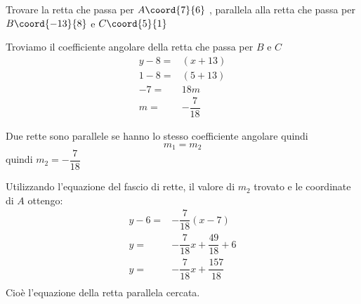 	Trovare la retta che passa per $A\coord{7}{6}$ , parallela alla retta che passa per $B\coord{-13}{8}$ e $C\coord{5}{1}$

	Troviamo il coefficiente angolare della retta che passa per $B$ e $C$
	\begin{align*}
		y-8=&(x+13)\\
		1-8=&(5+13)\\
		-7=&18m\\
		m=&-\dfrac{7}{18}
	\end{align*}

		Due rette sono parallele se hanno lo stesso coefficiente angolare quindi \[m_1=m_2 \]
		quindi $m_2=-\dfrac{7}{18}$

		Utilizzando l'equazione del fascio di rette, il valore di $m_2$ trovato e le coordinate di $A$ ottengo:
		\begin{align*}
			y-6=&-\dfrac{7}{18}(x-7)\\
			y=&-\dfrac{7}{18}x+\dfrac{49}{18}+6\\
			y=&-\dfrac{7}{18}x+\dfrac{157}{18}\\
		\end{align*}
		Cioè l'equazione della retta parallela cercata.
			\begin{center}
				
			\end{center}
